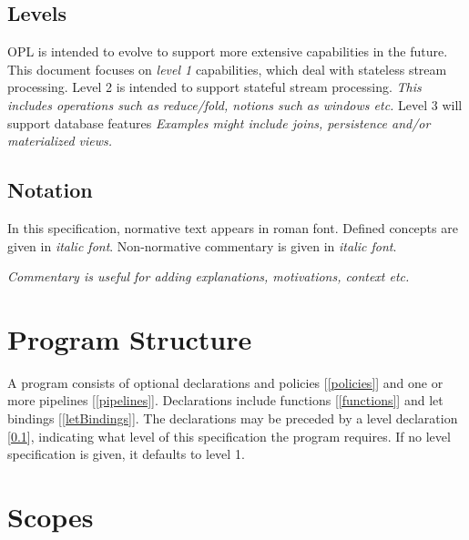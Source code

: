 \documentclass{article}
\begin{document}
\subsection{Levels}
\label{levels}

OPL  is intended to evolve to support more extensive capabilities in the future. This document focuses on {\em level 1} capabilities, which deal with stateless stream processing.
Level  2 is intended to support stateful stream processing.
{\em This includes operations such as reduce/fold, notions such as windows etc. }
Level 3 will support  database features {\em Examples might include joins, persistence and/or materialized views.}
\subsection{Notation}
\label{notation}

In this specification, normative text appears in roman font. Defined concepts are given in {\em italic font}. Non-normative commentary is given in {\em italic font}.

{\em Commentary is useful for adding explanations, motivations, context etc.}



\section{Program Structure}
\label{programStructure}

A program consists of optional declarations and policies [\ref{policies}] and one or more pipelines [\ref{pipelines}]. Declarations include functions [\ref{functions}] and let bindings [\ref{letBindings}]. The declarations may be preceded by a level declaration [\ref{levels}], indicating what level of this specification the program requires.  If no level specification is given, it defaults to level 1.


\OPLProgram{}
\LevelDecl{}
\Decl{}




\section{Scopes}
\label{scopes}
\end{document}
